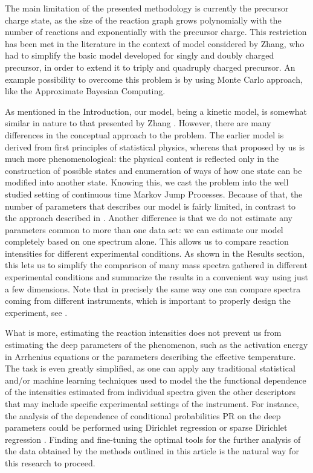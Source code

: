 \documentclass{llncs}
\begin{document}
        The main limitation of the presented methodology is currently the precursor charge state, as the size of the reaction graph grows polynomially  with the number of reactions and exponentially with the precursor charge. This restriction has been met in the literature in the context of model considered by Zhang, who had to simplify the basic model developed for singly and doubly charged precursor, in order to extend it to triply and quadruply charged precursor. An example possibility to overcome this problem is by using Monte Carlo approach, like the Approximate Bayesian Computing.

        As mentioned in the Introduction, our model, being a kinetic model, is somewhat similar in nature to that presented by Zhang \cite{Zhang2010-fp}. However, there are many differences in the conceptual approach to the problem. The earlier model is derived from first principles of statistical physics, whereas that proposed by us is much more phenomenological: the physical content is reflected only in the construction of possible states and enumeration of ways of how one state can be modified into another state. Knowing this, we cast the problem into the well studied setting of continuous time Markov Jump Processes. Because of that, the number of parameters that describes our model is fairly limited, in contrast to the approach described in  \cite{Zhang2010-fp}. Another difference is that we do not estimate any parameters common to more than one data set: we can estimate our model completely based on one spectrum alone. This allows us to compare reaction intensities for different experimental conditions. As shown in the Results section, this lets us to simplify the comparison of many mass spectra gathered in different experimental conditions and summarize the results in a convenient way using just a few dimensions. Note that in precisely the same way one can compare spectra coming from different instruments, which is important to properly design the experiment, see \cite{Lermyte2015-iv}.

        What is more, estimating the reaction intensities does not prevent us from estimating the deep parameters of the phenomenon, such as the activation energy in Arrhenius equations or the parameters describing the effective temperature. The task is even greatly simplified, as one can apply any traditional statistical and/or machine learning techniques used to model the the functional dependence of the intensities estimated from individual spectra given the other descriptors that may include specific experimental settings of the instrument. For instance, the analysis of the dependence of conditional probabilities PR on the deep parameters could be performed using Dirichlet regression or sparse Dirichlet regression \cite{Chen2013-zb}. Finding and fine-tuning the optimal tools for the further analysis of the data obtained by the methods outlined in this article is the natural way for this research to proceed.


{\footnotesize}
\end{document}
